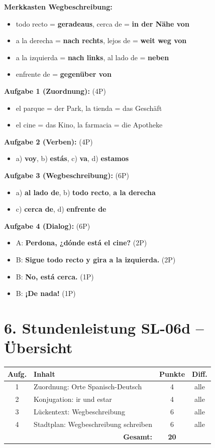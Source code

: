 \documentclass[11pt, a4paper]{article}
\newcommand{\loesung}[1]{\textcolor{loesung}{\textbf{#1}}}
\begin{document}
\textbf{Merkkasten Wegbeschreibung:}
\begin{itemize}
    \item todo recto = \loesung{geradeaus}, cerca de = \loesung{in der Nähe von}
    \item a la derecha = \loesung{nach rechts}, lejos de = \loesung{weit weg von}
    \item a la izquierda = \loesung{nach links}, al lado de = \loesung{neben}
    \item enfrente de = \loesung{gegenüber von}
\end{itemize}

\textbf{Aufgabe 1 (Zuordnung):} (4P)
\begin{itemize}
    \item el parque = der Park, la tienda = das Geschäft
    \item el cine = das Kino, la farmacia = die Apotheke
\end{itemize}

\textbf{Aufgabe 2 (Verben):} (4P)
\begin{itemize}
    \item a) \loesung{voy}, b) \loesung{estás}, c) \loesung{va}, d) \loesung{estamos}
\end{itemize}

\textbf{Aufgabe 3 (Wegbeschreibung):} (6P)
\begin{itemize}
    \item a) \loesung{al lado de}, b) \loesung{todo recto}, \loesung{a la derecha}
    \item c) \loesung{cerca de}, d) \loesung{enfrente de}
\end{itemize}

\textbf{Aufgabe 4 (Dialog):} (6P)
\begin{itemize}
    \item A: \loesung{Perdona, ¿dónde está el cine?} (2P)
    \item B: \loesung{Sigue todo recto y gira a la izquierda.} (2P)
    \item B: \loesung{No, está cerca.} (1P)
    \item B: \loesung{¡De nada!} (1P)
\end{itemize}

\section*{6. Stundenleistung SL-06d -- Übersicht}

\begin{tabular}{|c|l|c|c|}
\hline
\textbf{Aufg.} & \textbf{Inhalt} & \textbf{Punkte} & \textbf{Diff.} \\
\hline
1 & Zuordnung: Orte Spanisch-Deutsch & 4 & alle \\
\hline
2 & Konjugation: ir und estar & 4 & alle \\
\hline
3 & Lückentext: Wegbeschreibung & 6 & alle \\
\hline
4 & Stadtplan: Wegbeschreibung schreiben & 6 & alle \\
\hline
\multicolumn{2}{|r|}{\textbf{Gesamt:}} & \textbf{20} & \\
\hline
\end{tabular}
\end{document}
